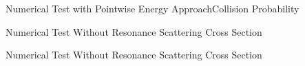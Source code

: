 \documentclass[sans,mathserif,aspectratio=169, 10pt]{beamer}
\begin{document}
\begin{frame}{Numerical Test with Pointwise Energy Approach}{Collision Probability}
\centering
{}
\end{frame}

\begin{frame}{Numerical Test Without Resonance Scattering Cross Section}
\centering
{}
\end{frame}

\begin{frame}{Numerical Test Without Resonance Scattering Cross Section}
\centering
{}
\end{frame}
\end{document}

